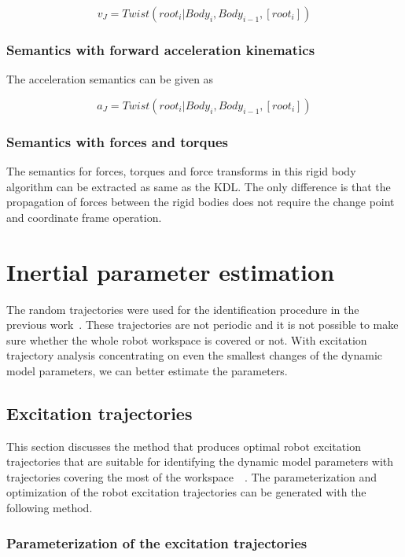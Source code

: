 \begin{equation}
v_J = Twist(root_i|Body_i, Body_{i-1}, [root_i])
\end{equation}

\subsubsection*{Semantics with forward acceleration kinematics}

The acceleration semantics can be given as

\begin{equation}
a_J = Twist(root_i|Body_i, Body_{i-1}, [root_i])
\end{equation}

\subsubsection*{Semantics with forces and torques}
The semantics for forces, torques and force transforms in this rigid body algorithm can be extracted as same as the KDL. The only difference is that the propagation of forces between the rigid bodies does not require the change point and coordinate frame operation. 

\section{Inertial parameter estimation}

The random trajectories were used for the identification procedure in the previous work~\cite{RnD2Rajagopal}. These trajectories are not periodic and it is not possible to make sure whether the whole robot workspace is covered or not. With excitation trajectory analysis concentrating on even the smallest changes of the dynamic model parameters, we can better estimate the parameters.

\subsection{Excitation trajectories}
This section discusses the method that produces optimal robot excitation trajectories that are suitable for identifying the dynamic model parameters with trajectories covering the most of the workspace~\cite{SweversJ1997Orea}~\cite{vantilt2015optimal}. The parameterization and optimization of the robot excitation trajectories can be generated with the following method. 

\subsubsection*{Parameterization of the excitation trajectories}


